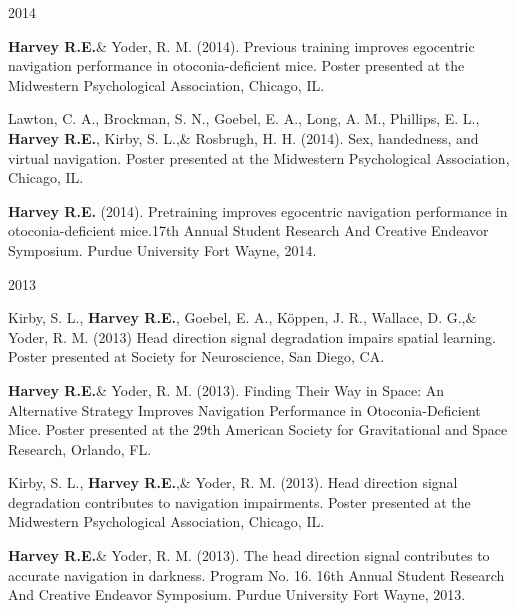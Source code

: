 \begin{cventries}
\cventry
    {} %
    {} %
    {} %
    {2014} %
    {
      \begin{cvitems} %
      \setlength\itemsep{0.4em}
        \item {\textbf{Harvey R.E.}\& Yoder, R. M. (2014). Previous training improves egocentric navigation performance in otoconia-deficient mice. Poster presented at the Midwestern Psychological Association, Chicago, IL.}
        \item {Lawton, C. A., Brockman, S. N., Goebel, E. A., Long, A. M., Phillips, E. L., \textbf{Harvey R.E.}, Kirby, S. L.,\& Rosbrugh, H. H. (2014). Sex, handedness, and virtual navigation. Poster presented at the Midwestern Psychological Association, Chicago, IL.}
        \item {\textbf{Harvey R.E.} (2014). Pretraining improves egocentric navigation performance in otoconia-deficient mice.17th Annual Student Research And Creative Endeavor Symposium. Purdue University Fort Wayne, 2014.}
      \end{cvitems}
    }
\end{cventries}

\begin{cventries}
\cventry
    {} %
    {} %
    {} %
    {2013} %
    {
      \begin{cvitems} %
      \setlength\itemsep{0.4em}
        \item {Kirby, S. L., \textbf{Harvey R.E.}, Goebel, E. A., Köppen, J. R., Wallace, D. G.,\& Yoder, R. M. (2013) Head direction signal degradation impairs spatial learning. Poster presented at Society for Neuroscience, San Diego, CA.}
        \item {\textbf{Harvey R.E.}\& Yoder, R. M. (2013). Finding Their Way in Space: An Alternative Strategy Improves Navigation Performance in Otoconia-Deficient Mice. Poster presented at the 29th American Society for Gravitational and Space Research, Orlando, FL.}
        \item {Kirby, S. L., \textbf{Harvey R.E.},\& Yoder, R. M. (2013). Head direction signal degradation contributes to navigation impairments. Poster presented at the Midwestern Psychological Association, Chicago, IL.}
        \item {\textbf{Harvey R.E.}\& Yoder, R. M. (2013). The head direction signal contributes to accurate navigation in darkness. Program No. 16. 16th Annual Student Research And Creative Endeavor Symposium. Purdue University Fort Wayne, 2013.}
      \end{cvitems}
    }
\end{cventries}